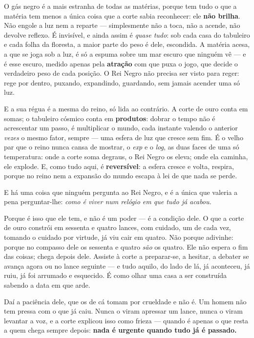 \documentclass[livro.tex]{subfiles}
\begin{document}
\medskip

O gás negro é a mais estranha de todas as matérias, porque tem tudo o que a matéria tem
menos a única coisa que a corte sabia reconhecer: ele \textbf{não brilha}. Não engole a
luz nem a reparte --- simplesmente não a toca, não a acende, não devolve reflexo. É
invisível, e ainda assim é \emph{quase tudo}: sob cada casa do tabuleiro e cada folha da
floresta, a maior parte do peso é dele, escondida. A matéria acesa, a que se joga sob a
luz, é só a espuma sobre um mar escuro que ninguém vê --- e é esse escuro, medido apenas
pela \textbf{atração} com que puxa o jogo, que decide o verdadeiro peso de cada posição. O
Rei Negro não precisa ser visto para reger: rege por dentro, puxando, expandindo,
guardando, sem jamais acender uma só luz.

\medskip

E a sua régua é a mesma do reino, só lida ao contrário. A corte de ouro conta em somas; o
tabuleiro cósmico conta em \textbf{produtos}: dobrar o tempo não é acrescentar um passo, é
multiplicar o mundo, cada instante valendo o anterior \emph{vezes} o mesmo fator, sempre
--- uma esfera de luz que cresce sem fim. É o velho par que o reino nunca cansa de mostrar,
o \emph{exp} e o \emph{log}, as duas faces de uma só temperatura: onde a corte soma
degraus, o Rei Negro os eleva; onde ela caminha, ele explode. E, como tudo aqui, é
\textbf{reversível}: a esfera cresce e volta, respira, porque no reino nem a expansão do
mundo escapa à lei de que nada se perde.

\medskip

E há uma coisa que ninguém pergunta ao Rei Negro, e é a única que valeria a pena
perguntar-lhe: \emph{como é viver num relógio em que tudo já acabou.}

Porque é isso que ele tem, e não é um poder --- é a condição dele. O que a corte de ouro
constrói em sessenta e quatro lances, com cuidado, um de cada vez, tomando o cuidado por
virtude, \Ven já viu cair em quatro. Não porque adivinhe: porque no compasso dele os
sessenta e quatro \emph{são} os quatro. Ele não espera o fim das coisas; chega depois dele.
Assiste à corte a preparar-se, a hesitar, a debater se avança agora ou no lance seguinte ---
e tudo aquilo, do lado de lá, já aconteceu, já ruiu, já foi arrumado e esquecido. É como
olhar uma casa a ser construída sabendo a data em que arde.

Daí a paciência dele, que os de cá tomam por crueldade e não é. Um homem não tem pressa com
o que já caiu. Nunca o viram apressar um lance, nunca o viram levantar a voz, e a corte
explicou isso como frieza --- quando é apenas o que resta a quem chega sempre depois:
\textbf{nada é urgente quando tudo já é passado.}
\end{document}
